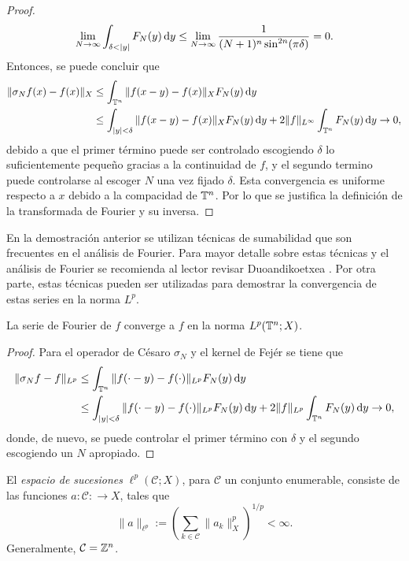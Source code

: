 \begin{proof}
	 \begin{equation*}
	 	\lim_{N\to\infty}\int_{\delta<|y|} F_N(y) \diff y \leq \lim_{N\to\infty} \frac{1}{(N+1)^n\sin^{2n}(\pi \delta)} =0.
	 \end{equation*}
	 Entonces, se puede concluir que 
	 \begin{align*}
	 	\|\sigma_Nf(x) - f(x)\|_X & \leq \int_{\mathbb{T}^n} \|f(x-y) - f(x)\|_X F_N(y) \mathop{}\!\mathrm{d} y \\
	 	& \leq \int_{|y|<\delta} \|f(x-y) - f(x)\|_XF_N(y) \mathop{}\!\mathrm{d} y +2\|f\|_{L^\infty} \int_{\mathbb{T}^n} F_N(y) \mathop{}\!\mathrm{d} y \to 0,
	 \end{align*}
	 debido a que el primer término puede ser controlado escogiendo $\delta$ lo suficientemente pequeño gracias a la continuidad de $f$, y el segundo termino puede controlarse al escoger $N$ una vez fijado $\delta$. Esta convergencia es uniforme respecto a $x$ debido a la compacidad de $\mathbb{T}^n$. Por lo que se justifica la definición de la transformada de Fourier y su inversa.
\end{proof}
\begin{remark}
	En la demostración anterior se utilizan técnicas de sumabilidad que son frecuentes en el análisis de Fourier. Para mayor detalle sobre estas técnicas y el análisis de Fourier se recomienda al lector revisar Duoandikoetxea \cite{duoandikoetxea}. Por otra parte, estas técnicas pueden ser utilizadas para demostrar la convergencia de estas series en la norma $L^p$.
\end{remark}
\begin{theorem}
	La serie de Fourier de $f$ converge a $f$ en la norma $L^p(\mathbb{T}^n;X)$.
\end{theorem}
\begin{proof}
	Para el operador de Césaro $\sigma_N$ y el kernel de Fejér se tiene que 
	\begin{align*}
		\|\sigma_Nf -f\|_{L^p}  & \leq \int_{\mathbb{T}^n} \|f(\cdot-y) - f(\cdot)\|_{L^p} F_N(y) \mathop{}\!\mathrm{d} y \\
		& \leq \int_{|y|<\delta} \|f(\cdot-y) - f(\cdot)\|_{L^p}F_N(y) \mathop{}\!\mathrm{d} y +2\|f\|_{L^p} \int_{\mathbb{T}^n} F_N(y) \mathop{}\!\mathrm{d} y \to 0,
	\end{align*}
	donde, de nuevo, se puede controlar el primer término con $\delta$ y el segundo escogiendo un $N$ apropiado. 
\end{proof}
\begin{definition}
	El \textit{espacio de sucesiones} $\ell^p(\mathcal{C};X)$, para $\mathcal{C}$ un conjunto enumerable, consiste de las funciones $a:\mathcal{C}:\to X$, tales que 
	\begin{equation*}
		\|a\|_{\ell^p} := \left( \sum_{k\in\mathcal{C}}\|a_k\|_X^p \right)^{1/p} <\infty.
	\end{equation*}
	Generalmente, $\mathcal{C}=\mathbb{Z}^n$.
\end{definition}
